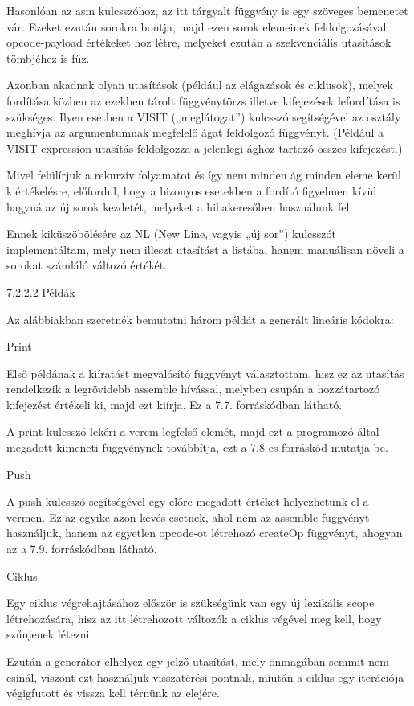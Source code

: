 Hasonlóan az asm kulcsszóhoz, az itt tárgyalt függvény is egy szöveges bemenetet vár. Ezeket ezután sorokra bontja, majd ezen sorok elemeinek feldolgozásával opcode-payload értékeket hoz létre, melyeket ezután a szekvenciális utasítások tömbjéhez is fűz.

Azonban akadnak olyan utasítások (például az elágazások és ciklusok), melyek fordítása közben az ezekben tárolt függvénytörzs illetve kifejezések lefordítása is szükséges. Ilyen esetben a VISIT („meglátogat”) kulcsszó segítségével az osztály meghívja az argumentumnak megfelelő ágat feldolgozó függvényt. (Például a VISIT expression utasítás feldolgozza a jelenlegi ághoz tartozó összes kifejezést.)

Mivel felülírjuk a rekurzív folyamatot és így nem minden ág minden eleme kerül kiértékelésre, előfordul, hogy a bizonyos esetekben a fordító figyelmen kívül hagyná az új sorok kezdetét, melyeket a hibakeresőben használunk fel.

Ennek kiküszöbölésére az NL (New Line, vagyis „új sor”) kulcsszót implementáltam, mely nem illeszt utasítást a listába, hanem manuálisan növeli a sorokat számláló változó értékét.

7.2.2.2 Példák

Az alábbiakban szeretnék bemutatni három példát a generált lineáris kódokra:

Print

Első példának a kiíratást megvalósító függvényt választottam, hisz ez az utasítás rendelkezik a legrövidebb assemble hívással, melyben csupán a hozzátartozó kifejezést értékeli ki, majd ezt kiírja. Ez a 7.7. forráskódban látható.

A print kulcsszó lekéri a verem legfelső elemét, majd ezt a programozó által megadott kimeneti függvénynek továbbítja, ezt a 7.8-es forráskód mutatja be. 

Push

A push kulcsszó segítségével egy előre megadott értéket helyezhetünk el a vermen. Ez az egyike azon kevés esetnek, ahol nem az assemble függvényt használjuk, hanem az egyetlen opcode-ot létrehozó createOp függvényt, ahogyan az a 7.9. forráskódban látható.

Ciklus

Egy ciklus végrehajtásához először is szükségünk van egy új lexikális scope létrehozására, hisz az itt létrehozott változók a ciklus végével meg kell, hogy szűnjenek létezni.

Ezután a generátor elhelyez egy jelző utasítást, mely önmagában semmit nem csinál, viszont ezt használjuk visszatérési pontnak, miután a ciklus egy iterációja végigfutott és vissza kell térnünk az elejére.

